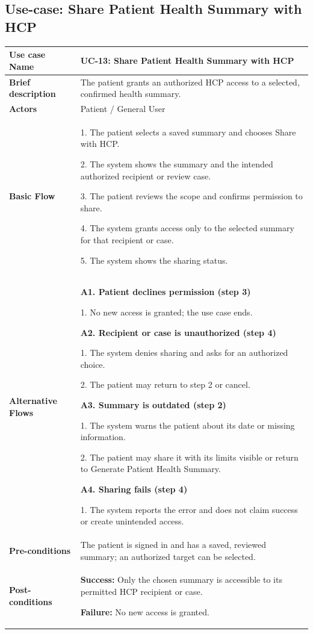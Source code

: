 \clearpage
\subsection{Use-case: Share Patient Health Summary with HCP}
\label{uc:uc-13}
\begin{longtable}{|p{}|p{}|}
\hline
\textbf{Use case Name} & UC-13: Share Patient Health Summary with HCP \\ \hline
\textbf{Brief description} & The patient grants an authorized HCP access to a selected, confirmed health summary. \\ \hline
\textbf{Actors} & Patient / General User \\ \hline
\textbf{Basic Flow} &
1. The patient selects a saved summary and chooses Share with HCP.\par
2. The system shows the summary and the intended authorized recipient or review case.\par
3. The patient reviews the scope and confirms permission to share.\par
4. The system grants access only to the selected summary for that recipient or case.\par
5. The system shows the sharing status.
\\ \hline
\textbf{Alternative Flows} &
\textbf{A1. Patient declines permission (step 3)}\par
1. No new access is granted; the use case ends.
\par\smallskip
\textbf{A2. Recipient or case is unauthorized (step 4)}\par
1. The system denies sharing and asks for an authorized choice.\par
2. The patient may return to step 2 or cancel.
\par\smallskip
\textbf{A3. Summary is outdated (step 2)}\par
1. The system warns the patient about its date or missing information.\par
2. The patient may share it with its limits visible or return to Generate Patient Health Summary.
\par\smallskip
\textbf{A4. Sharing fails (step 4)}\par
1. The system reports the error and does not claim success or create unintended access.
\\ \hline
\textbf{Pre-conditions} & The patient is signed in and has a saved, reviewed summary; an authorized target can be selected. \\ \hline
\textbf{Post-conditions} & \textbf{Success:} Only the chosen summary is accessible to its permitted HCP recipient or case.\par
\textbf{Failure:} No new access is granted. \\ \hline
\end{longtable}

